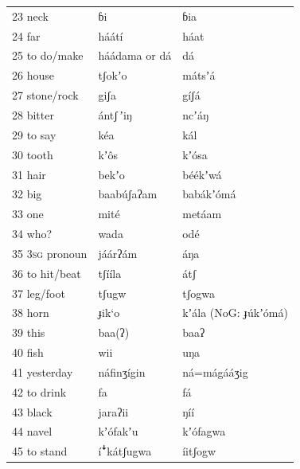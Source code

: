 \documentclass[output=paper]{langsci/langscibook}
\begin{document}
\begin{longtable}{p{}  p{} p{}}
23 neck & ɓi & ɓia \\

24 far & háátí & háat \\

25 to do/make & háádama  or     dá & dá \\

26 house & tʃokʼo & mátsʼá \\

27 stone/rock & giʃa & gíʃá \\

28 bitter & ántʃ\,ʼiŋ & ncʼáŋ \\

29 to say & kéa & kál \\

30 tooth & kʼ\^{o}s & kʼ\'{o}sa \\

31 hair & bekʼo & béékʼwá \\

32 big & baab\'{u}ʃaʔam & babákʼ\'{o}má \\

33 one & mité & metáam \\

34 who? & wada & odé \\

35 3\textsc{sg} pronoun & jáárʔám & áŋa \\

36 to hit/beat & tʃííla & átʃ \\

37 leg/foot & tʃugw & tʃogwa \\

38 horn & ɟik‘o & kʼála (NoG: ɟ\'{u}kʼ\'{o}má) \\

39 this & baa(ʔ) & baaʔ \\

40 fish & wii & uŋa \\

41 yesterday & náfinʒígin & ná=mágááʒig \\

42 to drink & fa & fá \\

43 black & jaraʔii & ŋíí \\

44 navel & kʼ\'{o}fakʼu & kʼ\'{o}fagwa \\

45 to stand & í\textsf{ꜜ}kátʃugwa & íitʃogw \\


\end{longtable}
\end{document}
